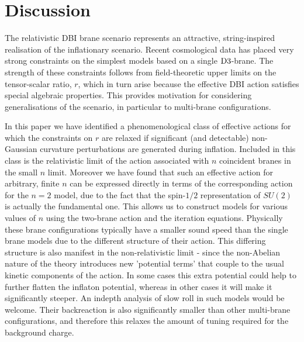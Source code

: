 {%
% 
% 
\section{Discussion}
\label{sec:disc-multi}


The relativistic DBI brane scenario represents an attractive, 
string-inspired realisation of the inflationary scenario. Recent
cosmological data has placed very strong constraints on the simplest 
models based on a single ${\rm D3}$-brane. The strength 
of these constraints follows from field-theoretic upper limits 
on the tensor-scalar ratio, $r$, which in turn arise because 
the effective DBI action satisfies special  
algebraic properties. This provides motivation 
for considering generalisations of the scenario, in particular to 
multi-brane configurations. 


In this paper we have identified a phenomenological class of 
effective actions for which the constraints 
on $r$ are relaxed if significant (and detectable) 
non-Gaussian curvature perturbations are generated during inflation. 
Included in this class is the relativistic limit of the 
action associated with $n$ 
coincident branes in the small $n$ limit. Moreover 
we have found that such an effective action for arbitrary, finite $n$ 
can be expressed directly in terms of the corresponding action 
for the $n = 2$ model, due to the fact that the spin-$1/2$ representation
of $SU(2)$ is actually the fundamental one. This allows us to construct models for various values of
$n$ using the
two-brane action and the iteration equations.
Physically these brane configurations typically 
have a smaller sound speed than the single brane models due to
the different structure of their action. This differing structure is also
manifest in the non-relativistic limit - since the non-Abelian nature of the theory
introduces new 'potential terms' that couple to the usual kinetic components of the 
action. In some cases this extra potential could help to further flatten the inflaton potential, 
whereas in other cases it will make it significantly steeper. An indepth analysis of slow roll in
such models would be welcome.
Their backreaction is also significantly smaller than other multi-brane 
configurations, and therefore this relaxes the amount of tuning 
required for the background charge.


}
